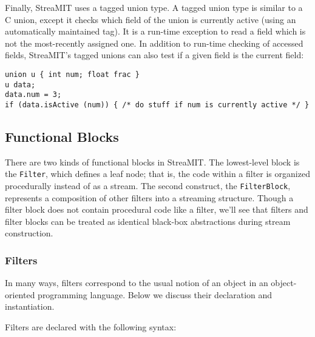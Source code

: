 \documentclass[draft]{article}
\begin{document}
Finally, StreaMIT uses a tagged union type.  A tagged union type is similar
to a C union, except it checks which field of the union is currently active
(using an automatically maintained tag).  It is a run-time exception to
read a field which is not the most-recently assigned one.  In addition
to run-time checking of accessed fields, StreaMIT's tagged unions can also
test if a given field is the current field:

\begin{verbatim}
union u { int num; float frac }
u data;
data.num = 3;
if (data.isActive (num)) { /* do stuff if num is currently active */ }
\end{verbatim}

\subsection{Functional Blocks}
\protect\label{sec:blocks}

There are two kinds of functional blocks in StreaMIT.  The
lowest-level block is the {\tt Filter}, which defines a leaf node;
that is, the code within a filter is organized procedurally instead of
as a stream.  The second construct, the {\tt FilterBlock}, represents
a composition of other filters into a streaming structure.  Though a
filter block does not contain procedural code like a filter, we'll see
that filters and filter blocks can be treated as identical black-box
abstractions during stream construction.

\subsubsection{Filters}

In many ways, filters correspond to the usual notion of an object in
an object-oriented programming language.  Below we discuss their
declaration and instantiation.

\medskip
{}
\medskip

Filters are declared with the following syntax:
\end{document}

